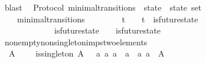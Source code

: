 \begin{isabellebody}
\ blast%
\endisatagproof
{\isafoldproof}%
%
\isadelimproof
\isanewline
%
\endisadelimproof
\isanewline
\isanewline
\isanewline
\isanewline
\isanewline
\isanewline
\isanewline
{}\isamarkupfalse%
\ {\isacharparenleft}\ Protocol{\isacharparenright}\ minimal{\isacharunderscore}transitions\ {\isacharcolon}{\isacharcolon}\ {\isachardoublequoteopen}{\isacharparenleft}state\ {\isacharasterisk}\ state{\isacharparenright}\ set{\isachardoublequoteclose}\isanewline
\ \ \isanewline
\ \ \ \ {\isachardoublequoteopen}minimal{\isacharunderscore}transitions\ {\isasymequiv}\ {\isacharbraceleft}{\isacharparenleft}{\isasymsigma}{\isacharcomma}\ {\isasymsigma}{\isacharprime}{\isacharparenright}\ {\isacharbar}\ {\isasymsigma}\ {\isasymsigma}{\isacharprime}{\isachardot}\ {\isasymsigma}\ {\isasymin}\ {\isasymSigma}t\ {\isasymand}\ {\isasymsigma}{\isacharprime}\ {\isasymin}\ {\isasymSigma}t\ {\isasymand}\ is{\isacharunderscore}future{\isacharunderscore}state\ {\isacharparenleft}{\isasymsigma}{\isacharcomma}\ {\isasymsigma}{\isacharprime}{\isacharparenright}\ {\isasymand}\ {\isasymsigma}\ {\isasymnoteq}\ {\isasymsigma}{\isacharprime}\isanewline
\ \ \ \ \ \ {\isasymand}\ {\isacharparenleft}{\isasymnexists}\ {\isasymsigma}{\isacharprime}{\isacharprime}{\isachardot}\ {\isasymsigma}{\isacharprime}{\isacharprime}\ {\isasymin}\ {\isasymSigma}\ {\isasymand}\ is{\isacharunderscore}future{\isacharunderscore}state\ {\isacharparenleft}{\isasymsigma}{\isacharcomma}\ {\isasymsigma}{\isacharprime}{\isacharprime}{\isacharparenright}\ {\isasymand}\ is{\isacharunderscore}future{\isacharunderscore}state\ {\isacharparenleft}{\isasymsigma}{\isacharprime}{\isacharprime}{\isacharcomma}\ {\isasymsigma}{\isacharprime}{\isacharparenright}\ {\isasymand}\ {\isasymsigma}\ {\isasymnoteq}\ {\isasymsigma}{\isacharprime}{\isacharprime}\ {\isasymand}\ {\isasymsigma}{\isacharprime}{\isacharprime}\ {\isasymnoteq}\ {\isasymsigma}{\isacharprime}{\isacharparenright}{\isacharbraceright}{\isachardoublequoteclose}\isanewline
\isanewline
{}\isamarkupfalse%
\ non{\isacharunderscore}empty{\isacharunderscore}non{\isacharunderscore}singleton{\isacharunderscore}imps{\isacharunderscore}two{\isacharunderscore}elements\ {\isacharcolon}\ \isanewline
\ \ {\isachardoublequoteopen}A\ {\isasymnoteq}\ {\isasymemptyset}\ {\isasymLongrightarrow}\ {\isasymnot}\ is{\isacharunderscore}singleton\ A\ {\isasymLongrightarrow}\ {\isasymexists}\ a{}\ a{}{\isachardot}\ a{}\ {\isasymnoteq}\ a{}\ {\isasymand}\ {\isacharbraceleft}a{}{\isacharcomma}\ a{}{\isacharbraceright}\ {\isasymsubseteq}\ A{\isachardoublequoteclose}\isanewline

\end{isabellebody}
